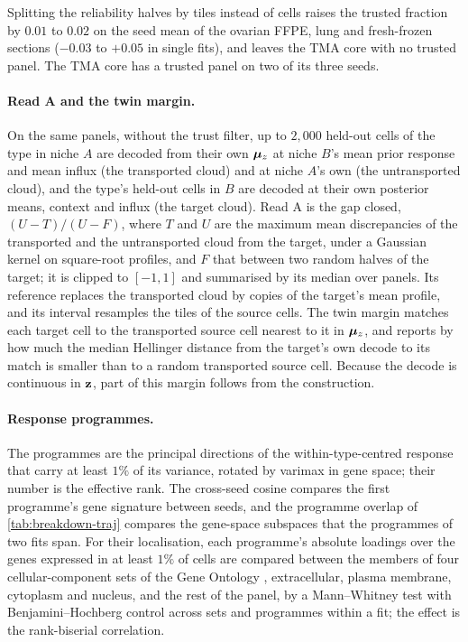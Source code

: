 Splitting the reliability halves by tiles instead of cells raises the trusted fraction by $0.01$ to $0.02$ on the seed mean of the ovarian FFPE, lung and fresh-frozen sections ($-0.03$ to $+0.05$ in single fits), and leaves the TMA core with no trusted panel.
The TMA core has a trusted panel on two of its three seeds.

\paragraph{Read A and the twin margin.} On the same panels, without the trust filter, up to $2{,}000$ held-out cells of the type in niche $A$ are decoded from their own $\boldsymbol{\mu}_z$ at niche $B$'s mean prior response and mean influx (the transported cloud) and at niche $A$'s own (the untransported cloud), and the type's held-out cells in $B$ are decoded at their own posterior means, context and influx (the target cloud). Read A is the gap closed, $(U - T)/(U - F)$, where $T$ and $U$ are the maximum mean discrepancies \citep{gretton2012} of the transported and the untransported cloud from the target, under a Gaussian kernel on square-root profiles, and $F$ that between two random halves of the target; it is clipped to $[-1, 1]$ and summarised by its median over panels. Its reference replaces the transported cloud by copies of the target's mean profile, and its interval resamples the tiles of the source cells. The twin margin matches each target cell to the transported source cell nearest to it in $\boldsymbol{\mu}_z$, and reports by how much the median Hellinger distance from the target's own decode to its match is smaller than to a random transported source cell. Because the decode is continuous in $\mathbf{z}$, part of this margin follows from the construction.

\paragraph{Response programmes.} The programmes are the principal directions of the within-type-centred response that carry at least $1\%$ of its variance, rotated by varimax \citep{kaiser1958} in gene space; their number is the effective rank. The cross-seed cosine compares the first programme's gene signature between seeds, and the programme overlap of \cref{tab:breakdown-traj} compares the gene-space subspaces that the programmes of two fits span. For their localisation, each programme's absolute loadings over the genes expressed in at least $1\%$ of cells are compared between the members of four cellular-component sets of the Gene Ontology \citep{ashburner2000,go2023}, extracellular, plasma membrane, cytoplasm and nucleus, and the rest of the panel, by a Mann--Whitney test with Benjamini--Hochberg control \citep{benjamini1995} across sets and programmes within a fit; the effect is the rank-biserial correlation.

